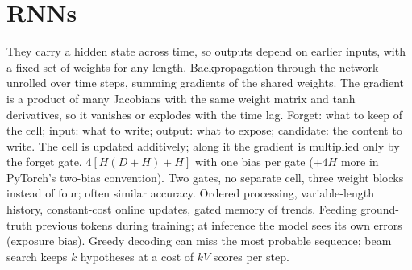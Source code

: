 \section{RNNs}
\begin{rapid}
	 They carry a hidden state across time, so outputs depend on earlier inputs, with a fixed set of
	weights for any length.
	 Backpropagation through the network unrolled over time steps, summing gradients of the shared weights.
	 The gradient is a product of many Jacobians with the same weight
	matrix and tanh derivatives, so it vanishes or explodes with the time lag.
	 Forget: what to keep of the cell; input: what to write; output: what to expose; candidate:
	the content to write.
	 The cell is updated additively; along it the gradient is multiplied only by the forget gate.
	 $4[H(D+H)+H]$ with one bias per gate ($+4H$ more in PyTorch's two-bias convention).
	 Two gates, no separate cell, three weight blocks instead of four; often similar accuracy.
	 Ordered processing, variable-length history, constant-cost online updates, gated memory of
	trends.
	 Feeding ground-truth previous tokens during training; at inference the model sees its own
	errors (exposure bias).
	 Greedy decoding can miss the most probable sequence; beam search keeps $k$ hypotheses at a cost of $kV$
	scores per step.
\end{rapid}

